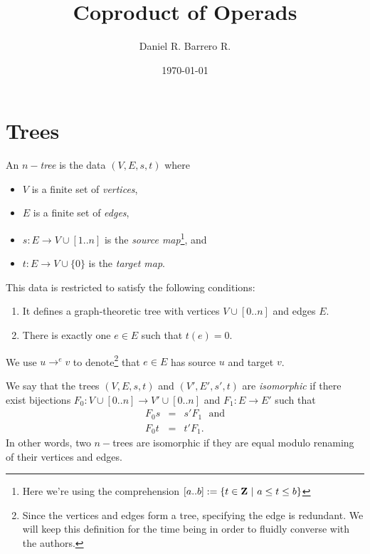 \documentclass{amsart}
\title{Coproduct of Operads}
\author{Daniel R. Barrero R.}
\date{\today}
\begin{document}

\maketitle

\section{Trees}

\begin{defn}\label{def-tree}
	An $n-$\emph{tree} is the data $(V, E, s, t)$ where
	\begin{itemize}
		\item $V$ is a finite set of \emph{vertices},
		\item $E$ is a finite set of \emph{edges},
		\item $s : E \to V \cup [1..n]$ is the
			\emph{source map}\footnote{Here we're using the
			comprehension $[a..b] :=
			\{t \in \mathbf{Z} \ | \ a \leq t \leq b\}$}, and
		\item $t : E \to V \cup \{0\}$ is the \emph{target map}.
	\end{itemize}
	This data is restricted to satisfy the following conditions:
	\begin{enumerate}
		\item It defines a graph-theoretic tree with vertices
			$V \cup [0..n]$ and edges $E$.
		\item There is exactly one $e \in E$ such that $t(e) = 0$.
	\end{enumerate}
	We use $u \to^{e} v$ to denote\footnote{Since the vertices and
	edges form a tree,  specifying the edge is redundant. We will keep
	this definition for the time being in order to fluidly converse
	with the authors.} that $e \in E$ has source $u$ and target $v$.
\end{defn}

\begin{defn}\label{tree-iso}
	We say that the trees $(V,E,s,t)$ and $(V',E',s',t)$ are
	\emph{isomorphic} if there exist bijections $F_0 : V \cup [0..n]
	\to V' \cup [0..n]$ and $F_1 : E \to E'$ such that
	\begin{eqnarray}
		F_0 s &=& s' F_1 \ \ \ \text{and} \\
		F_0 t &=& t' F_1.
	\end{eqnarray}
	In other words, two $n-$trees are isomorphic if they are equal modulo renaming of their vertices and edges.
\end{defn}
\end{document}
